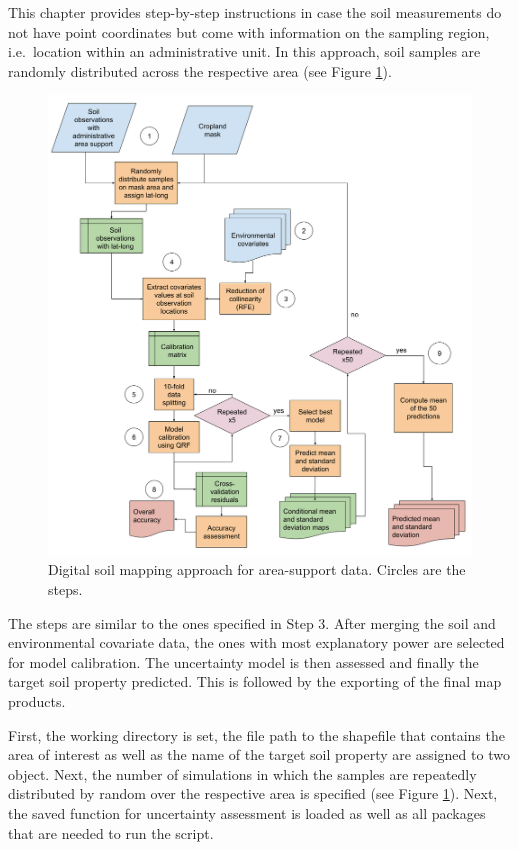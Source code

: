 \documentclass[
  10pt,
  b5paper,
  oneside]{book}
\begin{document}
This chapter provides step-by-step instructions in case the soil measurements do not have point coordinates but come with information on the sampling region, i.e.~location within an administrative unit. In this approach, soil samples are randomly distributed across the respective area (see Figure \ref{fig:workflow2}).

\begin{figure}
\includegraphics[width=16.1in]{images/workflow_county_data} \caption{Digital soil mapping approach for area-support data. Circles are the steps.}\label{fig:workflow2}
\end{figure}

The steps are similar to the ones specified in Step 3. After merging the soil and environmental covariate data, the ones with most explanatory power are selected for model calibration. The uncertainty model is then assessed and finally the target soil property predicted. This is followed by the exporting of the final map products.

First, the working directory is set, the file path to the shapefile that contains the area of interest as well as the name of the target soil property are assigned to two object. Next, the number of simulations in which the samples are repeatedly distributed by random over the respective area is specified (see Figure \ref{fig:workflow2}). Next, the saved function for uncertainty assessment is loaded as well as all packages that are needed to run the script.
\end{document}
